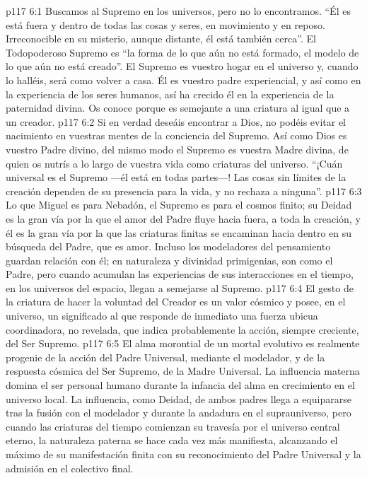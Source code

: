 \vs p117 6:1 Buscamos al Supremo en los universos, pero no lo encontramos. “Él es está fuera y dentro de todas las cosas y seres, en movimiento y en reposo. Irreconocible en su misterio, aunque distante, él está también cerca”. El Todopoderoso Supremo es “la forma de lo que aún no está formado, el modelo de lo que aún no está creado”. El Supremo es vuestro hogar en el universo y, cuando lo halléis, será como volver a casa. Él es vuestro padre experiencial, y así como en la experiencia de los seres humanos, así ha crecido él en la experiencia de la paternidad divina. Os conoce porque es semejante a una criatura al igual que a un creador.
\vs p117 6:2 Si en verdad deseáis encontrar a Dios, no podéis evitar el nacimiento en vuestras mentes de la conciencia del Supremo. Así como Dios es vuestro Padre divino, del mismo modo el Supremo es vuestra Madre divina, de quien os nutrís a lo largo de vuestra vida como criaturas del universo. “¡Cuán universal es el Supremo ---él está en todas partes---! Las cosas sin límites de la creación dependen de su presencia para la vida, y no rechaza a ninguna”.
\vs p117 6:3 Lo que Miguel es para Nebadón, el Supremo es para el cosmos finito; su Deidad es la gran vía por la que el amor del Padre fluye hacia fuera, a toda la creación, y él es la gran vía por la que las criaturas finitas se encaminan hacia dentro en su búsqueda del Padre, que es amor. Incluso los modeladores del pensamiento guardan relación con él; en naturaleza y divinidad primigenias, son como el Padre, pero cuando acumulan las experiencias de sus interacciones en el tiempo, en los universos del espacio, llegan a semejarse al Supremo.
\vs p117 6:4 \pc El gesto de la criatura de hacer la voluntad del Creador es un valor cósmico y posee, en el universo, un significado al que responde de inmediato una fuerza ubicua coordinadora, no revelada, que indica probablemente la acción, siempre creciente, del Ser Supremo.
\vs p117 6:5 El alma morontial de un mortal evolutivo es realmente progenie de la acción del Padre Universal, mediante el modelador, y de la respuesta cósmica del Ser Supremo, de la Madre Universal. La influencia materna domina el ser personal humano durante la infancia del alma en crecimiento en el universo local. La influencia, como Deidad, de ambos padres llega a equipararse tras la fusión con el modelador y durante la andadura en el suprauniverso, pero cuando las criaturas del tiempo comienzan su travesía por el universo central eterno, la naturaleza paterna se hace cada vez más manifiesta, alcanzando el máximo de su manifestación finita con su reconocimiento del Padre Universal y la admisión en el colectivo final.
